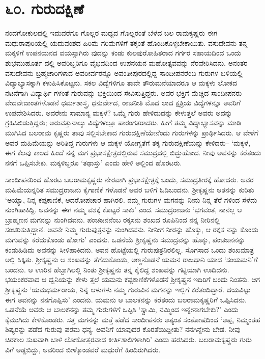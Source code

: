 
\chapter{೬೦. ಗುರುದಕ್ಷಿಣೆ}

ನಂದಗೋಕುಲದಲ್ಲಿ ಇದುವರೆಗೂ ಗೊಲ್ಲರ ಮಧ್ಯದ ಗೊಲ್ಲರಂತೆ ಬೆಳೆದ ಬಲ ರಾಮಕೃಷ್ಣರು ಈಗ ಮಧುರಾಪುರಿಯಲ್ಲಿ ಯದುವಂಶದ ಹಿರಿಮೆ ಗರಿಮೆಗಳಿಗೆ ತಕ್ಕಂತೆ ಹೊಂದಿಕೊಳ್ಳಬೇಕಾಯಿತು. ವಸುದೇವನು ತನ್ನ ಮಕ್ಕಳಿಗೆ ಉಪನಯನದ ವಯಸ್ಸಾಗಿರು ವುದನ್ನು ಕಂಡು ಕುಲಪುರೋಹಿತರಾದ ಗರ್ಗರ ಸಹಾಯದಿಂದ ಒಂದು ಶುಭಮುಹೂರ್ತ ದಲ್ಲಿ ಅವರಿಬ್ಬರಿಗೂ ವೈಭವದಿಂದ ಉಪನಯನ ಮಹೋತ್ಸವವನ್ನು ನೆರವೇರಿಸಿದನು. ಅನಂತರ ವಸುದೇವನು ಬ್ರಹ್ಮಚಾರಿಗಳಾದ ಅವರೀರ್ವರನ್ನೂ ಅವಂತೀಪುರದಲ್ಲಿದ್ದ ಸಾಂದೀಪನರೆಂಬ ಗುರುಗಳ ಬಳಿಯಲ್ಲಿ ವಿದ್ಯಾಭ್ಯಾಸಕ್ಕಾಗಿ ಕಳುಹಿಸಿಕೊಟ್ಟನು. ಸಕಲ ವಿದ್ಯೆಗಳಿಗೂ ತಾವೇ ತೌರುಮನೆಯಾದರೂ ಆ ಮಕ್ಕಳು ಲೋಕದ ನಟನೆಗಾಗಿ ವಿದ್ಯಾರ್ಥಿ ಗಳಂತೆ ಗುರುವನ್ನು ಭಕ್ತಿಯಿಂದ ಸೇವಿಸುತ್ತಿದ್ದರು. ಅವರ ಭಕ್ತಿಗೆ ಮೆಚ್ಚಿದ ಸಾಂದೀಪನರು ವೇದವೇದಾಂತಗಳೊಡನೆ ಧರ್ಮಶಾಸ್ತ್ರ, ಧನುರ್ವೇದ, ರಾಜನೀತಿ ಮೊದ ಲಾದ ಕ್ಷತ್ರಿಯ ವಿದ್ಯೆಗಳನ್ನೂ ಅವರಿಗೆ ಉಪದೇಶಿಸಿದರು. ಅವರೇನು ಸಾಮಾನ್ಯ ಮಕ್ಕಳೆ? ಒಮ್ಮೆ ಗುರು ಹೇಳಿದುದನ್ನು ಕೇಳುತ್ತಲೆ ಅವರು ಅದನ್ನು ಗ್ರಹಿಸಿಬಿಡುತ್ತಿದ್ದರು; ಅರುವತ್ತುನಾಲ್ಕು ವಿದ್ಯೆಗಳಲ್ಲೂ ಪಾರಂಗತರಾದರು. ಹೀಗೆ ತಮ್ಮ ವಿದ್ಯಾಭ್ಯಾಸವನ್ನು ಮಾಡಿ ಮುಗಿಸಿದ ಬಲರಾಮ ಕೃಷ್ಣರು ತಾವು ಸಲ್ಲಿಸಬೇಕಾದ ಗುರುದಕ್ಷಿಣೆಯೇನೆಂದು ಗುರುಗಳನ್ನು ಪ್ರಾರ್ಥಿಸಿದರು. ಆ ವೇಳೆಗೆ ಅವರ ಮಹಿಮೆಯನ್ನು ಅರಿತಿದ್ದ ಗುರುಗಳು ಆ ಮಕ್ಕಳ ಯೋಗ್ಯತೆಗೆ ತಕ್ಕ ಗುರುದಕ್ಷಿಣೆಯನ್ನು ಕೇಳಿದರು– ‘ಮಕ್ಕಳೆ, ಈಗ ಕೆಲವು ಕಾಲದ ಹಿಂದೆ ನನ್ನ ಮಗ ಪ್ರಭಾಸಕ್ಷೇತ್ರದಲ್ಲಿರುವ ಸಮುದ್ರದಲ್ಲಿ ಬಿದ್ದುಹೋದ. ನೀವು ಅವನನ್ನು ಕರೆತಂದು ನನಗೆ ಒಪ್ಪಿಸಬೇಕು. ಮಕ್ಕಳಿಬ್ಬರೂ ‘ತಥಾಸ್ತು’ ಎಂದು ಹೇಳಿ ಅಲ್ಲಿಂದ ಹೊರಟರು.

ಸಾಂದೀಪನರಿಂದ ಹೊರಟ ಬಲರಾಮಕೃಷ್ಣರು ನೇರವಾಗಿ ಪ್ರಭಾಸಕ್ಷೇತ್ರಕ್ಕೆ ಬಂದು, ಸಮುದ್ರತೀರಕ್ಕೆ ಹೋದರು. ಅವರ ಮಹಿಮೆಯನ್ನರಿತ ಸಮುದ್ರರಾಜನು ಕೈಗಾಣಿಕೆ ಗಳೊಡನೆ ಅವರ ಬಳಿಗೆ ಓಡಿಬಂದನು. ಶ್ರೀಕೃಷ್ಣನು ಆತನನ್ನು ಕುರಿತು ‘ಅಯ್ಯಾ, ನಿನ್ನ ಕಪ್ಪಕಾಣಿಕೆ, ಆದರೋಪಚಾರ ಹಾಗಿರಲಿ. ನಮ್ಮ ಗುರುಗಳ ಮಗನನ್ನು ನೀನು ನಿನ್ನ ತೆರೆ ಗಳಿಂದ ಸೆಳೆದು ನುಂಗಿಹಾಕಿದ್ದಿ. ಅವನನ್ನು ಈಗ ನಮ್ಮ ವಶಕ್ಕೆ ಕೊಟ್ಟರೆ ಸಾಕು’ ಎಂದ. ಸಮುದ್ರರಾಜನು ‘ಭಗವಂತ, ನಾನಲ್ಲ ಆ ಬ್ರಾಹ್ಮಣನ ಮಗನನ್ನು ನುಂಗಿದವನು. ಪಂಚಜನನೆಂಬ ರಕ್ಕಸನು ಶಂಖದ ರೂಪಿನಿಂದ ನನ್ನ ನೀರಿನಲ್ಲಿ ಸಂಚರಿಸುತ್ತಿದ್ದಾನೆ. ಅವನೇ ನಿಮ್ಮ ಗುರುಪುತ್ರನನ್ನು ನುಂಗಿದವನು. ನೀನೀಗ ನೀರನ್ನು ಹೊಕ್ಕು, ಆ ರಕ್ಕಸ ನನ್ನು ಕೊಂದು ಮಗುವನ್ನು ಕರೆದುಕೊಂಡು ಹೋಗು’ ಎಂದನು. ಒಡನೆಯೆ ಶ್ರೀಕೃಷ್ಣನು ಸಮುದ್ರವನ್ನು ಹೊಕ್ಕು, ಪಂಚಜನನನ್ನು ಕಂಡುಹಿಡಿದು ಅವನನ್ನು ಸೀಳಿಹಾಕಿದನು. ಅವನ ಹೊಟ್ಟೆಯಲ್ಲಿ ಗುರುಪುತ್ರನಿರಲಿಲ್ಲ. ಸೊಗಸಾದ ಒಂದು ಶಂಖಮಾತ್ರ ಅಲ್ಲಿ ಸಿಕ್ಕಿತು. ಶ್ರೀಕೃಷ್ಣನು ಆ ಶಂಖವನ್ನು ತೆಗೆದುಕೊಂಡು, ಅಣ್ಣನೊಡನೆ ಯಮನ ರಾಜಧಾನಿ ಯಾದ ‘ಸಂಯಮನಿ’ಗೆ ಬಂದನು. ಆ ಊರಿನ ಹೆಬ್ಬಾಗಿಲಲ್ಲಿ ನಿಂತು ಶ್ರೀಕೃಷ್ಣನು ತನ್ನ ಕೈಲಿದ್ದ ಶಂಖವನ್ನು ಗಟ್ಟಿಯಾಗಿ ಊದಿದನು. ಭಯಂಕರವಾದ ಆ ಧ್ವನಿಯನ್ನು ಕೇಳು ತ್ತಲೆ ಯಮನು ಕಪ್ಪಕಾಣಿಕೆಗಳೊಡನೆ ಶ್ರೀಕೃಷ್ಣನ ಇದಿರಿಗೆ ಬಂದು ನಿಂತನು. ಆಗ ಶ್ರೀಕೃಷ್ಣನು ‘ಯಮಧರ್ಮರಾಯ, ನಿನ್ನ ಆಳುಗಳು ನಮ್ಮ ಗುರುವಿನ ಮಗನನ್ನು ಇಲ್ಲಿಗೆ ಕರೆತಂದಿದ್ದಾರೆ. ದಯವಿಟ್ಟು ಈಗ ಅವನನ್ನು ನನಗೊಪ್ಪಿಸು’ ಎಂದನು. ಯಮನು ಆ ಬಾಲಕನನ್ನು ಕರೆತಂದು ಬಲರಾಮಕೃಷ್ಣರಿಗೆ ಒಪ್ಪಿಸಿದನು. ಒಡನೆಯೆ ಅವರು ಆ ಬಾಲಕನನ್ನು ತಮ್ಮ ಗುರುಗಳಿಗೆ ಒಪ್ಪಿಸಿ ‘ಸ್ವಾಮಿ, ನಮ್ಮಿಂದ ಇನ್ನೇನಾಗಬೇಕು?’ ಎಂದು ಕೈಮುಗಿದು ಕೇಳಿಕೊಂಡರು. ಸತ್ತ ಮಗನನ್ನು ಮತ್ತೆ ಪಡೆದ ಸಾಂದೀಪನರು ಅತ್ಯಂತ ಸಂತೋಷದಿಂದ ‘ಅಪ್ಪ, ನಿಮ್ಮಂತಹ ಶಿಷ್ಯರನ್ನು ಪಡೆದ ಗುರುವು ಪರಮ ಧನ್ಯ. ಅವನಿಗೆ ಯಾವುದರ ಕೊರತೆಯಿದ್ದೀತು? ನನಗಿನ್ನೇನು ಬೇಡ. ನೀವು ಚಿರಕಾಲ ಸುಖವಾಗಿ ಬಾಳಿ ಲೋಕೋತ್ತರವಾದ ಕೀರ್ತಿಶಾಲಿಗಳಾಗಿರಿ’ ಎಂದು ಹರಸಿದರು. ಬಲರಾಮಕೃಷ್ಣರು ಗುರು ವಿಗೆ ಅಡ್ಡಬಿದ್ದು, ಅವರಿಂದ ಬೀಳ್ಕೊಂಡವರೆ ಮಧುರೆಗೆ ಹಿಂದಿರುಗಿದರು.

